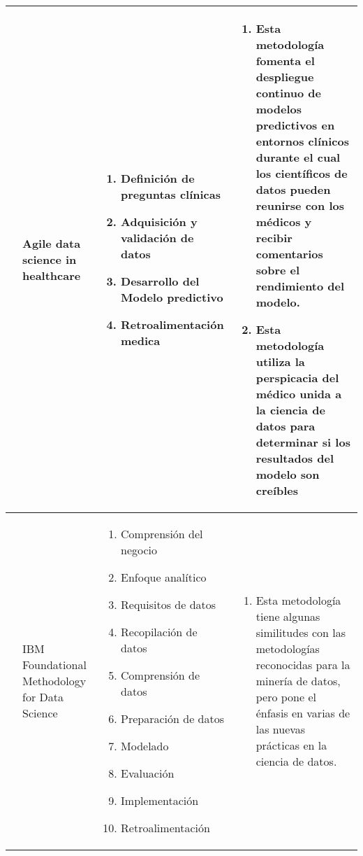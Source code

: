 \begin{table*}[!htb]
	\footnotesize
	\begin{threeparttable}	
		\begin{tabular}{p{1cm} p{2cm} p{5cm} p{6.5cm}} \toprule
			\cite{Lei2020}
			& Agile data science in healthcare 
			&  \begin{enumerate}
				\item Definición de preguntas clínicas 
				\item Adquisición y validación de datos
				\item Desarrollo del Modelo predictivo
				\item Retroalimentación medica
			\end{enumerate}
			& \begin{enumerate}
				\item Esta metodología fomenta el despliegue continuo de modelos predictivos en entornos clínicos durante el cual los científicos de datos pueden reunirse con los médicos y recibir comentarios sobre el rendimiento del modelo.
				\item Esta metodología utiliza la perspicacia del médico unida a la ciencia de datos para determinar si los resultados del modelo son creíbles
			\end{enumerate}
			\\ \hline
			\cite{Rollins2015}
			& IBM Foundational Methodology for Data Science
			&  \begin{enumerate}
				\item Comprensión del negocio
				\item Enfoque analítico
				\item Requisitos de datos
				\item Recopilación de datos
				\item Comprensión de datos
				\item Preparación de datos
				\item Modelado
				\item Evaluación
				\item Implementación
				\item Retroalimentación
			\end{enumerate}
			& \begin{enumerate}
				\item Esta metodología tiene algunas similitudes con las metodologías reconocidas para la minería de datos, pero pone el énfasis en varias de las nuevas prácticas en la ciencia de datos.

\end{enumerate}
\end{tabular}
\end{threeparttable}
\end{table*}
